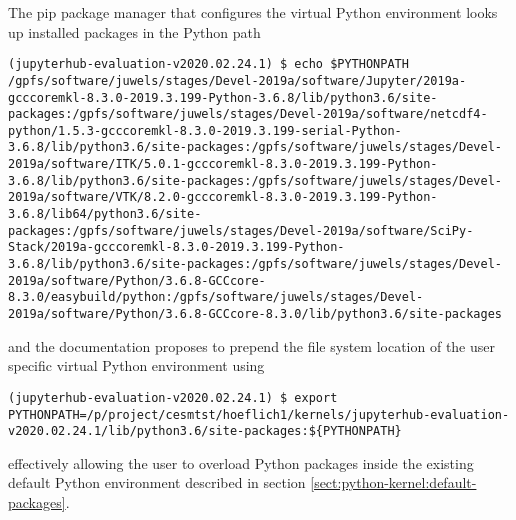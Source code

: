 The pip package manager that configures the virtual Python environment looks up installed packages in the Python path
%
\begin{verbatim}
(jupyterhub-evaluation-v2020.02.24.1) $ echo $PYTHONPATH
/gpfs/software/juwels/stages/Devel-2019a/software/Jupyter/2019a-gcccoremkl-8.3.0-2019.3.199-Python-3.6.8/lib/python3.6/site-packages:/gpfs/software/juwels/stages/Devel-2019a/software/netcdf4-python/1.5.3-gcccoremkl-8.3.0-2019.3.199-serial-Python-3.6.8/lib/python3.6/site-packages:/gpfs/software/juwels/stages/Devel-2019a/software/ITK/5.0.1-gcccoremkl-8.3.0-2019.3.199-Python-3.6.8/lib/python3.6/site-packages:/gpfs/software/juwels/stages/Devel-2019a/software/VTK/8.2.0-gcccoremkl-8.3.0-2019.3.199-Python-3.6.8/lib64/python3.6/site-packages:/gpfs/software/juwels/stages/Devel-2019a/software/SciPy-Stack/2019a-gcccoremkl-8.3.0-2019.3.199-Python-3.6.8/lib/python3.6/site-packages:/gpfs/software/juwels/stages/Devel-2019a/software/Python/3.6.8-GCCcore-8.3.0/easybuild/python:/gpfs/software/juwels/stages/Devel-2019a/software/Python/3.6.8-GCCcore-8.3.0/lib/python3.6/site-packages
\end{verbatim}
%
and the documentation proposes to prepend the file system location of the user specific virtual Python environment using
%
\begin{verbatim}
(jupyterhub-evaluation-v2020.02.24.1) $ export PYTHONPATH=/p/project/cesmtst/hoeflich1/kernels/jupyterhub-evaluation-v2020.02.24.1/lib/python3.6/site-packages:${PYTHONPATH}
\end{verbatim}
%
effectively allowing the user to overload Python packages inside the existing default Python environment described in section \ref{sect:python-kernel:default-packages}.

